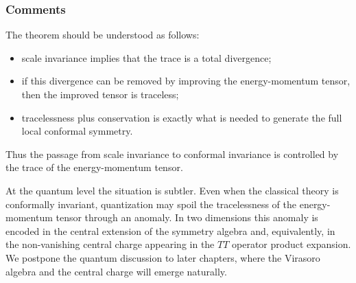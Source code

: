 \subsubsection{Comments}

The theorem should be understood as follows:
\begin{itemize}
    \item scale invariance implies that the trace is a total divergence;
    \item if this divergence can be removed by improving the energy-momentum tensor, then the improved tensor is traceless;
    \item tracelessness plus conservation is exactly what is needed to generate the full local conformal symmetry.
\end{itemize}
Thus the passage from scale invariance to conformal invariance is controlled by the trace of the energy-momentum tensor.

\begin{remark}
    At the quantum level the situation is subtler. Even when the classical theory is conformally invariant, quantization may spoil the tracelessness of the energy-momentum tensor through an anomaly. In two dimensions this anomaly is encoded in the central extension of the symmetry algebra and, equivalently, in the non-vanishing central charge appearing in the \(TT\) operator product expansion.
    We postpone the quantum discussion to later chapters, where the Virasoro algebra and the central charge will emerge naturally.
\end{remark}

